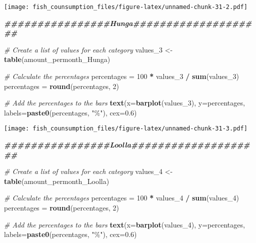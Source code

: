 \documentclass[
]{article}
\newenvironment{Shaded}{\begin{snugshade}}{\end{snugshade}}
\newcommand{\AttributeTok}[1]{\textcolor[rgb]{0.13,0.29,0.53}{#1}}
\newcommand{\CommentTok}[1]{\textcolor[rgb]{0.56,0.35,0.01}{\textit{#1}}}
\newcommand{\DecValTok}[1]{\textcolor[rgb]{0.00,0.00,0.81}{#1}}
\newcommand{\DocumentationTok}[1]{\textcolor[rgb]{0.56,0.35,0.01}{\textbf{\textit{#1}}}}
\newcommand{\FloatTok}[1]{\textcolor[rgb]{0.00,0.00,0.81}{#1}}
\newcommand{\FunctionTok}[1]{\textcolor[rgb]{0.13,0.29,0.53}{\textbf{#1}}}
\newcommand{\NormalTok}[1]{#1}
\newcommand{\OtherTok}[1]{\textcolor[rgb]{0.56,0.35,0.01}{#1}}
\newcommand{\SpecialCharTok}[1]{\textcolor[rgb]{0.81,0.36,0.00}{\textbf{#1}}}
\newcommand{\StringTok}[1]{\textcolor[rgb]{0.31,0.60,0.02}{#1}}
\begin{document}
\texttt{[image: fish\_counsumption\_files/figure-latex/unnamed-chunk-31-2.pdf]}

\begin{Shaded}
\begin{Highlighting}[]
\DocumentationTok{\#\#\#\#\#\#\#\#\#\#\#\#\#\#\#\#Hunga\#\#\#\#\#\#\#\#\#\#\#\#\#\#\#\#\#\#\#\#}

\CommentTok{\# Create a list of values for each category}
\NormalTok{values\_3 }\OtherTok{\textless{}{-}} \FunctionTok{table}\NormalTok{(amount\_permonth\_Hunga)}

\CommentTok{\# Calculate the percentages}
\NormalTok{percentages }\OtherTok{=} \DecValTok{100} \SpecialCharTok{*}\NormalTok{ values\_3 }\SpecialCharTok{/} \FunctionTok{sum}\NormalTok{(values\_3)}
\NormalTok{percentages }\OtherTok{=} \FunctionTok{round}\NormalTok{(percentages, }\DecValTok{2}\NormalTok{)}

\CommentTok{\# Add the percentages to the bars}
\FunctionTok{text}\NormalTok{(}\AttributeTok{x=}\FunctionTok{barplot}\NormalTok{(values\_3), }\AttributeTok{y=}\NormalTok{percentages, }\AttributeTok{labels=}\FunctionTok{paste0}\NormalTok{(percentages, }\StringTok{"\%"}\NormalTok{), }\AttributeTok{cex=}\FloatTok{0.6}\NormalTok{)}
\end{Highlighting}
\end{Shaded}

\texttt{[image: fish\_counsumption\_files/figure-latex/unnamed-chunk-31-3.pdf]}

\begin{Shaded}
\begin{Highlighting}[]
\DocumentationTok{\#\#\#\#\#\#\#\#\#\#\#\#\#\#\#\#Loolla\#\#\#\#\#\#\#\#\#\#\#\#\#\#\#\#\#\#\#\#}

\CommentTok{\# Create a list of values for each category}
\NormalTok{values\_4 }\OtherTok{\textless{}{-}} \FunctionTok{table}\NormalTok{(amount\_permonth\_Loolla)}

\CommentTok{\# Calculate the percentages}
\NormalTok{percentages }\OtherTok{=} \DecValTok{100} \SpecialCharTok{*}\NormalTok{ values\_4 }\SpecialCharTok{/} \FunctionTok{sum}\NormalTok{(values\_4)}
\NormalTok{percentages }\OtherTok{=} \FunctionTok{round}\NormalTok{(percentages, }\DecValTok{2}\NormalTok{)}

\CommentTok{\# Add the percentages to the bars}
\FunctionTok{text}\NormalTok{(}\AttributeTok{x=}\FunctionTok{barplot}\NormalTok{(values\_4), }\AttributeTok{y=}\NormalTok{percentages, }\AttributeTok{labels=}\FunctionTok{paste0}\NormalTok{(percentages, }\StringTok{"\%"}\NormalTok{), }\AttributeTok{cex=}\FloatTok{0.6}\NormalTok{)}
\end{Highlighting}
\end{Shaded}
\end{document}
